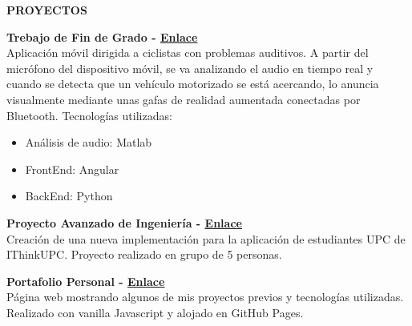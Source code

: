 \documentclass[../main.tex]{subfiles}
\begin{document}
    \textbf{\textcolor{myCV2}{PROYECTOS\underline{\hspace{15.43cm}}}}
    \vspace*{0.3cm}
    
    \textbf{Trebajo de Fin de Grado - 
        \hspace*{0.07cm}
        \textcolor{myCV2}{
        \vspace*{0.1cm}\underline{\href{https://www.youtube.com/watch?v=WKyUsdZbQ0Y}{Enlace}}}}\\
        Aplicación móvil dirigida a ciclistas con problemas auditivos. A partir del micrófono del dispositivo móvil, se va analizando el audio en tiempo real y cuando se detecta que un vehículo motorizado se está acercando, lo anuncia visualmente mediante unas gafas de realidad aumentada conectadas por Bluetooth. Tecnologías utilizadas:
        \begin{itemize}
            \vspace*{-0.2cm}
            \item Análisis de audio: Matlab
            \vspace*{-0.2cm}
            \item FrontEnd: Angular
            \vspace*{-0.2cm}
            \item BackEnd: Python
        \end {itemize}
        
        \textbf{Proyecto Avanzado de Ingeniería - 
         \hspace*{0.07cm}
         \textcolor{myCV2}{
        \vspace*{0.1cm}\underline{\href{https://www.youtube.com/watch?v=RrfiOulhY-E&t=7s}{Enlace}}}}\\
        Creación de una nueva implementación para la aplicación de estudiantes UPC de IThinkUPC. Proyecto realizado en grupo de 5 personas.

        \vspace*{0.25cm}
        \textbf{Portafolio Personal - 
         \hspace*{0.07cm}
         \textcolor{myCV2}{
        \vspace*{0.1cm}\underline{\href{https://albatalaya.github.io/}{Enlace}}}}\\
        Página web mostrando algunos de mis proyectos previos y tecnologías utilizadas. Realizado con vanilla Javascript y alojado en GitHub Pages.

        
\end{document}

